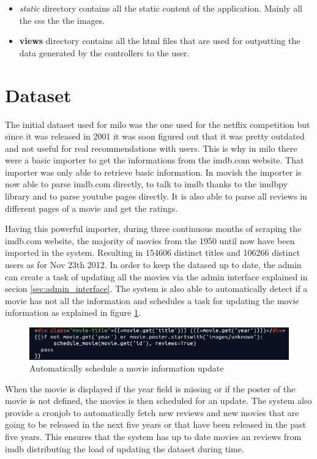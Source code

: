 \begin{itemize}
\item \textit{static} directory contains all the static content of the application. Mainly all the css the the images.
\item \textbf{views} directory contains all the html files that are used for outputting the data generated by the controllers to the user.
\end{itemize}

\section{Dataset}
\label{sec:dataset}

The initial dataset used for milo was the one used for the netflix competition \cite{netflixprize} but since it was released in 2001 it was soon figured out that it was pretty outdated and not useful for real recommendations with users. This is why in milo there were a basic importer to get the informations from the imdb.com website. That importer was only able to retrieve basic information. In movish the importer is now able to parse imdb.com directly, to talk to imdb thanks to the imdbpy \cite{imdbpy} library and to parse youtube pages directly. It is also able to parse all reviews in different pages of a movie and get the ratings.

Having this powerful importer, during three continuous months of scraping the imdb.com website, the majority of movies from the 1950 until now have been imported in the system. Resulting in 154606 distinct titles and 106266 distinct users as for Nov 23th 2012. In order to keep the datased up to date, the admin can create a task of updating all the movies via the admin interface explained in secion \ref{sec:admin_interface}. The system is also able to automatically detect if a movie has not all the information and schedules a task for updating the movie information as explained in figure \ref{fig:movie_update}.

\begin{figure}
  \centering
  \includegraphics[width=\textwidth]{figures/auto_update_movie.png}
  \caption{Automatically schedule a movie information update}
  \label{fig:movie_update}
\end{figure}

When the movie is displayed if the year field is missing or if the poster of the movie is not defined, the movies is then scheduled for an update. The system also provide a cronjob to automatically fetch new reviews and new movies that are going to be released in the next five years or that have been released in the past five years. This ensures that the system has up to date movies an reviews from imdb distributing the load of updating the dataset during time.

